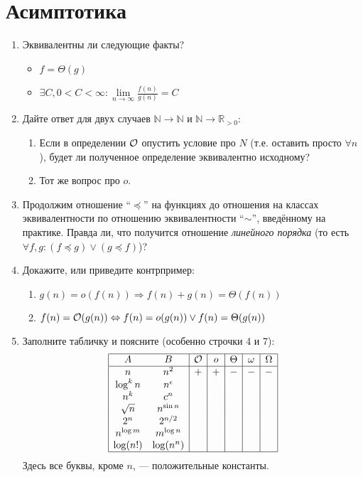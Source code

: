 \section{Асимптотика}
\begin{enumerate}
  \item	
	Эквивалентны ли следующие факты?
	\begin{itemize}
		\item $f = \Theta(g)$
		\item $\exists C,  0 < C < \infty : \lim\limits_{n \to \infty} \frac{f(n)}{g(n)} = C$
	\end{itemize}

  \item
    Дайте ответ для двух случаев $\mathbb{N} \to \mathbb{N}$ и $\mathbb{N} \to \mathbb{R}_{>0}$:
    \begin{enumerate}
      \item
        Если в определении $\mathcal{O}$ опустить условие про $N$ (т.е. оставить
        просто $\forall n$), будет ли полученное определение эквивалентно
        исходному?
      \item
        Тот же вопрос про $o$.
    \end{enumerate}

  \item
    Продолжим отношение ``$\preceq$'' на функциях до отношения на классах эквивалентности по отношению эквивалентности ``$\sim$'', введённому на практике. Правда ли, что получится отношение \textit{линейного порядка} (то есть
    $\forall f, g: (f \preceq g) \lor (g \preceq f)$)?

  \item
    Докажите, или приведите контрпример:
    \begin{enumerate}
      \item $g(n) = o(f(n)) \Rightarrow f(n) + g(n) = \Theta(f(n))$
      \item $f(n) = \mathcal{O}(g(n)) \Leftrightarrow f(n) = o(g(n)) \lor f(n) = \Theta(g(n))$
    \end{enumerate}

  \item Заполните табличку и поясните (особенно строчки 4 и 7):
    $$
    \begin{array}{|cc|c|c|c|c|c|}
      \hline
      A & B & \mathcal{O} & o & \Theta & \omega & \Omega \\
      \hline
      n & n^2 & + & + & - & - & - \\
      \log^k n & n^{\epsilon} & & & & & \\
      n^k & c^n & & & & & \\
      \sqrt{n} & n^{\sin n} & & & & & \\
      2^n & 2^{n \slash 2} & & & & & \\
      n^{\log m} & m^{\log n} & & & & & \\
      \log (n!) & \log(n^n) & & & & & \\
      \hline
    \end{array}
    $$
    Здесь все буквы, кроме $n$, --- положительные константы.


\end{enumerate}
